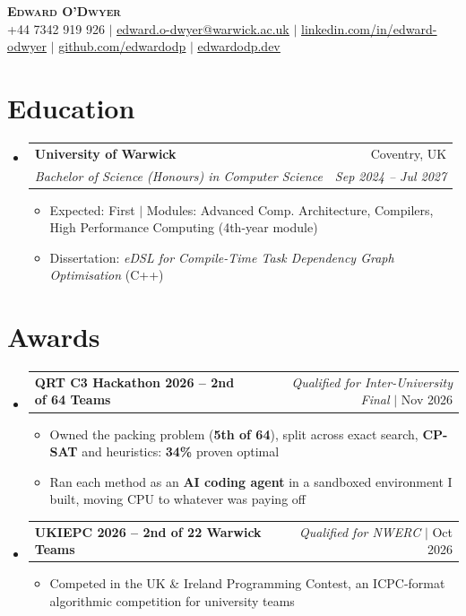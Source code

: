 \documentclass[letterpaper,10pt]{article}
\makeatletter
\newcommand{\resumeItem}[1]{
  \item\small{
    {#1 \vspace{-2pt}}
  }
}
\newcommand{\resumeSubheading}[4]{
  \vspace{-2pt}\item
    \begin{tabular*}{0.97\textwidth}[t]{l@{\extracolsep{\fill}}r}
      \textbf{#1} & #2 \\
      \textit{\small#3} & \textit{\small #4} \\
    \end{tabular*}\vspace{-7pt}
}
\newcommand{\resumeProjectHeading}[2]{
    \item
    \begin{tabular*}{0.97\textwidth}{l@{\extracolsep{\fill}}r}
      \small#1 & #2 \\
    \end{tabular*}\vspace{-7pt}
}
\newcommand{\resumeSubHeadingListStart}{\begin{itemize}[leftmargin=0.15in, label={}]}
\newcommand{\resumeSubHeadingListEnd}{\end{itemize}}
\newcommand{\resumeItemListStart}{\begin{itemize}}
\newcommand{\resumeItemListEnd}{\end{itemize}\vspace{-5pt}}
\makeatother
\begin{document}
\small

\begin{center}
    \textbf{\Huge \scshape Edward O'Dwyer} \\ \vspace{1pt}
    \small +44 7342 919 926 $|$ \href{mailto:edward.o-dwyer@warwick.ac.uk}{\underline{edward.o-dwyer@warwick.ac.uk}} $|$
    \href{https://www.linkedin.com/in/edward-odwyer}{\underline{linkedin.com/in/edward-odwyer}} $|$
    \href{https://github.com/edwardodp}{\underline{github.com/edwardodp}} $|$
    \href{https://edwardodp.dev}{\underline{edwardodp.dev}}
\end{center}


\section{Education}
  \resumeSubHeadingListStart
    \resumeSubheading
      {University of Warwick}{Coventry, UK}
      {Bachelor of Science (Honours) in Computer Science}{Sep 2024 -- Jul 2027}
      \resumeItemListStart
        \resumeItem{Expected: First $|$ Modules: Advanced Comp. Architecture, Compilers, High Performance Computing (4th-year module)}
        \resumeItem{Dissertation: \textit{eDSL for Compile-Time Task Dependency Graph Optimisation} (C++)}
    \resumeItemListEnd
  \resumeSubHeadingListEnd


\section{Awards}
    \resumeSubHeadingListStart
      \resumeProjectHeading
          {\textbf{QRT C3 Hackathon 2026 -- 2nd of 64 Teams}}{\textit{Qualified for Inter-University Final} $|$ Nov 2026}
          \resumeItemListStart
            \resumeItem{Owned the packing problem (\textbf{5th of 64}), split across exact search, \textbf{CP-SAT} and heuristics: \textbf{34\%} proven optimal}
            \resumeItem{Ran each method as an \textbf{AI coding agent} in a sandboxed environment I built, moving CPU to whatever was paying off}
          \resumeItemListEnd
      \resumeProjectHeading
          {\textbf{UKIEPC 2026 -- 2nd of 22 Warwick Teams}}{\textit{Qualified for NWERC} $|$ Oct 2026}
          \resumeItemListStart
            \resumeItem{Competed in the UK \& Ireland Programming Contest, an ICPC-format algorithmic competition for university teams}
          \resumeItemListEnd
    \resumeSubHeadingListEnd
\end{document}

